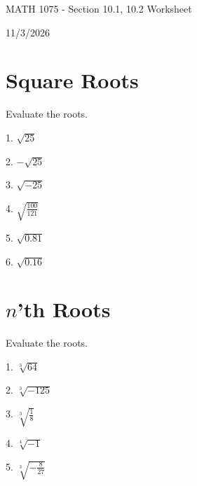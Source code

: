 \documentclass[12pt]{article}
\begin{document}
\begin{center}
    {\LARGE MATH 1075 - Section 10.1, 10.2 Worksheet}

    \vspace{2em}

    {\large 11/3/2026}
\end{center}
\section{Square Roots}

Evaluate the roots. 
\vspace{1.5em}

1. $\sqrt{25}$

\vspace{4.5em}

2. $-\sqrt{25}$

\vspace{4.5em}

3. $\sqrt{-25}$
\vspace{4.5em}

4. $\sqrt{\frac{100}{121} }$

\vspace{4.5em}

5. $\sqrt{0.81}$

\vspace{4.5em}

6. $\sqrt{0.16}$
\vspace{3.5em}
\section{$n $'th Roots}


Evaluate the roots. 
\vspace{1.5em}

1. $\sqrt[3]{64}$

\vspace{4.5em} 

2. $\sqrt[3]{-125}$

\vspace{4.5em} 

3. $\sqrt[3]{\frac{1}{8} }$

\vspace{4.5em} 

4. $\sqrt[4]{-1}$

\vspace{4.5em}

5. $\sqrt[3]{-\frac{8}{27} }$

\vspace{4.5em}
\end{document}
